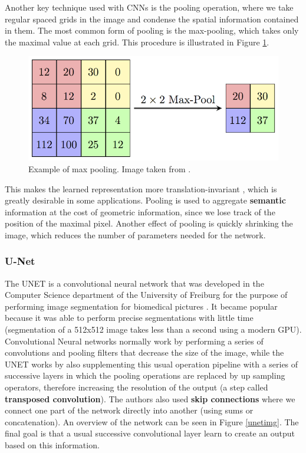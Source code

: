 Another key technique used with CNNs is the pooling operation, where we take regular spaced grids in the image and condense the spatial information contained in them. The most common form of pooling is the max-pooling, which takes only the maximal value at each grid. This procedure is illustrated in Figure \ref{pooling}.

\begin{figure}[H]
    \includegraphics[width=.7\textwidth]{Cap2-Methods/MaxpoolSample2.png}
    \centering
	\caption{Example of max pooling. Image taken from \cite{poolimg}.}
	\label{pooling}
\end{figure}

This makes the learned representation more translation-invariant \cite{dlbook}, which is greatly desirable in some applications. Pooling is used to aggregate \textbf{semantic} information at the cost of geometric information, since we lose track of the position of the maximal pixel. Another effect of pooling is quickly shrinking the image, which reduces the number of parameters needed for the network.

\subsubsection{U-Net}

The UNET is a convolutional neural network that was developed in the Computer Science department of the University of Freiburg for the purpose of performing image segmentation for
biomedical pictures \cite{Unet}. It became popular because it was able to perform precise segmentations with little time (segmentation of a 512x512 image takes less than a second using a modern GPU).
Convolutional Neural networks normally work by performing a series of convolutions and pooling filters that decrease the size of the image, while the UNET works by also 
supplementing this usual operation pipeline with a series of successive layers in which the pooling operations are replaced by up sampling operators, therefore increasing the resolution of the output (a step called \textbf{transposed convolution}).
The authors also used \textbf{skip connections} where we connect one part of the network directly into another (using sums or concatenation). An overview of the network can be seen in Figure \ref{unetimg}.
The final goal is that a usual successive convolutional layer learn to create an output based on this information. 

